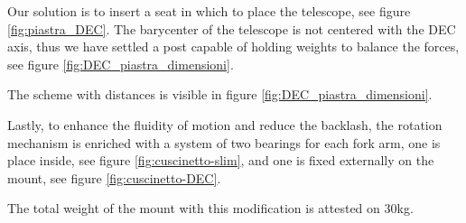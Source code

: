 Our solution is to insert a seat in which to place the telescope, see figure \ref{fig:piastra_DEC}.
The barycenter of the telescope is not centered with the DEC axis, thus we have settled a post capable of holding weights to balance the forces, see figure \ref{fig:DEC_piastra_dimensioni}.

The scheme with distances is visible in figure \ref{fig:DEC_piastra_dimensioni}.

Lastly, to enhance the fluidity of motion and reduce the backlash, the rotation mechanism is enriched with a system of two bearings for each fork arm, one is place inside, see figure \ref{fig:cuscinetto-slim}, and one is fixed externally on the mount, see figure \ref{fig:cuscinetto-DEC}.

The total weight of the mount with this modification is attested on 30kg.

